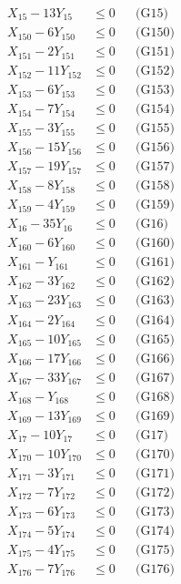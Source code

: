 \documentclass[a4paper,10pt]{article}
\begin{document}
{\begin{align}
X_{15} - 13Y_{15} &\leq 0 && \text{(G15)} \\
X_{150} - 6Y_{150} &\leq 0 && \text{(G150)} \\
X_{151} - 2Y_{151} &\leq 0 && \text{(G151)} \\
\allowbreak
X_{152} - 11Y_{152} &\leq 0 && \text{(G152)} \\
X_{153} - 6Y_{153} &\leq 0 && \text{(G153)} \\
X_{154} - 7Y_{154} &\leq 0 && \text{(G154)} \\
X_{155} - 3Y_{155} &\leq 0 && \text{(G155)} \\
X_{156} - 15Y_{156} &\leq 0 && \text{(G156)} \\
X_{157} - 19Y_{157} &\leq 0 && \text{(G157)} \\
X_{158} - 8Y_{158} &\leq 0 && \text{(G158)} \\
X_{159} - 4Y_{159} &\leq 0 && \text{(G159)} \\
X_{16} - 35Y_{16} &\leq 0 && \text{(G16)} \\
X_{160} - 6Y_{160} &\leq 0 && \text{(G160)} \\
X_{161} - Y_{161} &\leq 0 && \text{(G161)} \\
X_{162} - 3Y_{162} &\leq 0 && \text{(G162)} \\
X_{163} - 23Y_{163} &\leq 0 && \text{(G163)} \\
X_{164} - 2Y_{164} &\leq 0 && \text{(G164)} \\
X_{165} - 10Y_{165} &\leq 0 && \text{(G165)} \\
X_{166} - 17Y_{166} &\leq 0 && \text{(G166)} \\
X_{167} - 33Y_{167} &\leq 0 && \text{(G167)} \\
X_{168} - Y_{168} &\leq 0 && \text{(G168)} \\
X_{169} - 13Y_{169} &\leq 0 && \text{(G169)} \\
X_{17} - 10Y_{17} &\leq 0 && \text{(G17)} \\
\allowbreak
X_{170} - 10Y_{170} &\leq 0 && \text{(G170)} \\
X_{171} - 3Y_{171} &\leq 0 && \text{(G171)} \\
X_{172} - 7Y_{172} &\leq 0 && \text{(G172)} \\
X_{173} - 6Y_{173} &\leq 0 && \text{(G173)} \\
X_{174} - 5Y_{174} &\leq 0 && \text{(G174)} \\
X_{175} - 4Y_{175} &\leq 0 && \text{(G175)} \\
X_{176} - 7Y_{176} &\leq 0 && \text{(G176)} \\

\end{align}}
\end{document}

